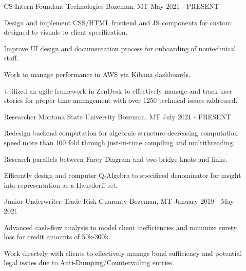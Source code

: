 
\begin{cventries}
  \cventry
      {CS Intern}
      {Foundant Technologies}
      {Bozeman, MT}
      {May 2021 - PRESENT}
      {
        \begin{cvitems}
          \item {Design and implement CSS/HTML frontend and JS components for custom designed to visuals to client specification.}
          \item {Improve UI design and documentation process for onboarding of nontechnical staff.}
          \item {Work to manage performance in AWS via Kibana dashboards.}
          \item {Utilized an agile framework in ZenDesk to effectively manage and track user stories for proper time management with over 1250 technical issues addressed.}
        \end{cvitems}  
      }
  \cventry
    {Researcher} %
    {Montana State University} %
    {Bozeman, MT} %
    {July 2021 - PRESENT} %
    {
      \begin{cvitems} %
        \item {Redesign backend computation for algebraic structure decreasing computation speed more than 100 fold through just-in-time compiling and multithreading.}
        \item {Research parallels between Farey Diagram and two-bridge knots and links.}
        \item {Efficently design and computer Q-Algebra to specificed denominator for insight into representation as a Hausdorff set.}
      \end{cvitems}
    }
  \cventry
        {Junior Underwriter}
        {Trade Risk Guaranty}
        {Bozeman, MT}
        {January 2019 - May 2021}
        {
          \begin{cvitems}
            \item {Advanced cash-flow analysis to model client inefficiencies and minimize surety loss for credit amounts of 50k-300k.}
            \item {Work directely with clients to effectively manage bond sufficiency and potential legal issues due to Anti-Dumping/Countervailing entries.}
          \end{cvitems}
        } 
\end{cventries}
